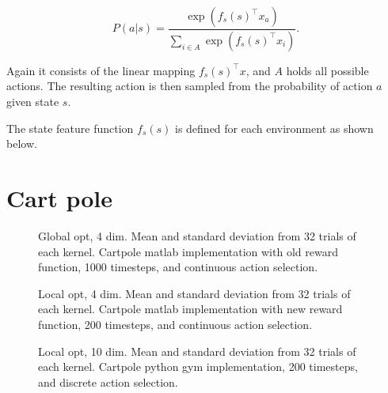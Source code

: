 $$P(a|s)= \frac{\exp(f_s(s)^\top x_a)}{\sum_{i\in A} \exp(f_s(s)^\top x_i)}.$$

Again it consists of the linear mapping $f_s(s)^\top x$, and $A$ holds all possible actions. The resulting action is then sampled from the probability of action $a$ given state $s$.

The state feature function $f_s(s)$ is defined for each environment as shown below.

\section{Cart pole}


\begin{figure}
    \begin{center}
        \caption{Global opt, 4 dim. Mean and standard deviation from 32 trials of each kernel. Cartpole matlab implementation with old reward function, 1000 timesteps, and continuous action selection.}
    \end{center}
\end{figure}

\begin{figure}
    \begin{center}
        \caption{Local opt, 4 dim. Mean and standard deviation from 32 trials of each kernel. Cartpole matlab implementation with new reward function, 200 timesteps, and continuous action selection.}
    \end{center}
\end{figure}

\begin{figure}
    \begin{center}
        \caption{Local opt, 10 dim. Mean and standard deviation from 32 trials of each kernel. Cartpole python gym implementation, 200 timesteps, and discrete action selection.}
    \end{center}
\end{figure}
